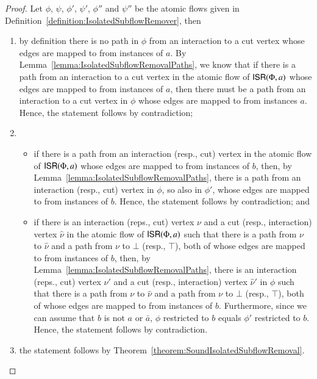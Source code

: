 \begin{proof}
Let $\phi$, $\psi$, $\phi'$, $\psi'$, $\phi''$ and $\psi''$ be the atomic flows given in Definition~\ref{definition:IsolatedSubflowRemover}, then
\begin{enumerate}
\item by definition there is no path in $\phi$ from an interaction to a cut vertex whose edges are mapped to from instances of $a$. By Lemma~\vref{lemma:IsolatedSubflowRemovalPaths}, we know that if there is a path from an interaction to a cut vertex in the atomic flow of $\mathsf{ISR}(\Phi,a)$ whose edges are mapped to from instances of $a$, then there must be a path from an interaction to a cut vertex in $\phi$ whose edges are mapped to from instances $a$. Hence, the statement follows by contradiction;
\item
\begin{itemize}
 \item if there is a path from an interaction (resp., cut) vertex in the atomic flow of $\mathsf{ISR}(\Phi,a)$ whose edges are mapped to from instances of $b$, then, by Lemma~\vref{lemma:IsolatedSubflowRemovalPaths}, there is a path from an interaction (resp., cut) vertex in $\phi$, so also in $\phi'$, whose edges are mapped to from instances of $b$. Hence, the statement follows by contradiction; and
 \item if there is an interaction (reps., cut) vertex $\nu$ and a cut (resp., interaction) vertex $\hat\nu$ in the atomic flow of $\mathsf{ISR}(\Phi,a)$ such that there is a path from $\nu$ to $\hat\nu$ and a path from $\nu$ to $\bot$ (resp., $\top$), both of whose edges are mapped to from instances of $b$, then, by Lemma~\vref{lemma:IsolatedSubflowRemovalPaths}, there is an interaction (reps., cut) vertex $\nu'$ and a cut (resp., interaction) vertex $\hat\nu'$ in $\phi$ such that there is a path from $\nu$ to $\hat\nu$ and a path from $\nu$ to $\bot$ (resp., $\top$), both of whose edges are mapped to from instances of $b$. Furthermore, since we can assume that $b$ is not $a$ or $\bar a$, $\phi$ restricted to $b$ equals $\phi'$ restricted to $b$. Hence, the statement follows by contradiction.
\end{itemize}
\item the statement follows by Theorem~\vref{theorem:SoundIsolatedSubflowRemoval}.
\end{enumerate}
\end{proof}

